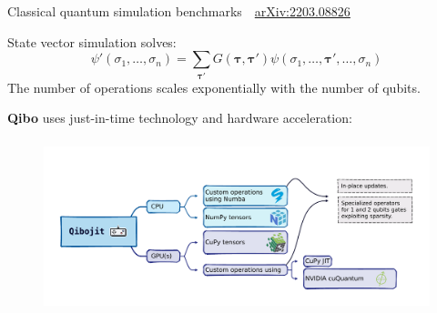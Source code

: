 \documentclass[aspectratio=169, 10pt, xcolor={svgnames}, hyperref={linkcolor=black}]{beamer}
\begin{document}
\begin{frame}{Classical quantum simulation benchmarks \hfill \faBook\,\, \href{https://arxiv.org/abs/2203.08826}{arXiv:2203.08826}}

   State vector simulation solves:
   \begin{equation*}
     \psi' (\sigma_1,\ldots,\sigma_n) = \sum_{\boldsymbol \tau'} G({\boldsymbol \tau},{\boldsymbol \tau}') \psi(\sigma_1,\ldots,{\boldsymbol \tau}',\ldots,\sigma_n)
   \end{equation*}
   The number of operations scales {\color{magenta} exponentially} with the number of qubits.

   \textbf{Qibo} uses just-in-time technology and hardware acceleration:
   \vspace{-0.35cm}
   \begin{figure}
     \includegraphics[height=5cm]{figures/qibojit.pdf}
   \end{figure}

 \end{frame}
\end{document}
